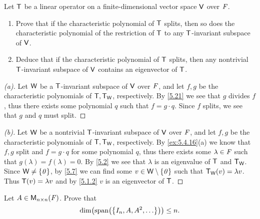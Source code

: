 \setcounter{ex}{15}
\begin{ex}\label{ex:5.4.16}
  Let \(\mathsf{T}\) be a linear operator on a finite-dimensional vector space \(\mathsf{V}\) over \(\mathit{F}\).
  \begin{enumerate}
    \item Prove that if the characteristic polynomial of \(\mathsf{T}\) splits, then so does the characteristic polynomial of the restriction of \(\mathsf{T}\) to any \(\mathsf{T}\)-invariant subspace of \(\mathsf{V}\).
    \item Deduce that if the characteristic polynomial of \(\mathsf{T}\) splits, then any nontrivial \(\mathsf{T}\)-invariant subspace of \(\mathsf{V}\) contains an eigenvector of \(\mathsf{T}\).
  \end{enumerate}
\end{ex}

\begin{proof}[(a)]
  Let \(\mathsf{W}\) be a \(\mathsf{T}\)-invariant subspace of \(\mathsf{V}\) over \(\mathit{F}\), and let \(f, g\) be the characteristic polynomials of \(\mathsf{T}, \mathsf{T}_{\mathsf{W}}\), respectively.
  By \cref{5.21} we see that \(g\) divides \(f\), thus there exists some polynomial \(q\) such that \(f = g \cdot q\).
  Since \(f\) splits, we see that \(g\) and \(q\) must split.
\end{proof}

\begin{proof}[(b)]
  Let \(\mathsf{W}\) be a nontrivial \(\mathsf{T}\)-invariant subspace of \(\mathsf{V}\) over \(\mathit{F}\), and let \(f, g\) be the characteristic polynomials of \(\mathsf{T}, \mathsf{T}_{\mathsf{W}}\), respectively.
  By \cref{ex:5.4.16}(a) we know that \(f, g\) split and \(f = g \cdot q\) for some polynomial \(q\), thus there exists some \(\lambda \in \mathit{F}\) such that \(g(\lambda) = f(\lambda) = 0\).
  By \cref{5.2} we see that \(\lambda\) is an eigenvalue of \(\mathsf{T}\) and \(\mathsf{T}_{\mathsf{W}}\).
  Since \(\mathsf{W} \neq \left\lbrace\mathit{0}\right\rbrace\), by \cref{5.7} we can find some \(v \in \mathsf{W} \setminus \left\lbrace\mathit{0}\right\rbrace\) such that \(\mathsf{T}_{\mathsf{W}}(v) = \lambda v\).
  Thus \(\mathsf{T}(v) = \lambda v\) and by \cref{5.1.2} \(v\) is an eigenvector of \(\mathsf{T}\).
\end{proof}

\begin{ex}\label{ex:5.4.17}
  Let \(A \in \ms[n][n][\F]\).
  Prove that
  \[
    \dim\pa{\spn{\set{I_n, A, A^2, \dots}}} \leq n.
  \]
\end{ex}

